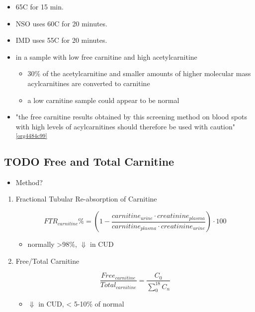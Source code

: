 \documentclass{scrartcl}
\begin{document}
\begin{enumerate}
\begin{itemize}
\item 65\degree{}C for 15 min.
\item NSO uses 60\degree{}C for 20 minutes.
\item IMD uses 55\degree{}C for 20 minutes.

\item in a sample with low free carnitine and high acetylcarnitine
\begin{itemize}
\item 30\% of the acetylcarnitine and smaller amounts of higher
molecular mass acylcarnitines are converted to carnitine
\item a low carnitine sample could appear to be normal
\end{itemize}
\item "the free carnitine results obtained by this screening method on
blood spots with high levels of acylcarnitines should therefore be
used with caution" \textsuperscript{\ref{org4484c99}}
\end{itemize}
\end{enumerate}


\subsection{{\bfseries\sffamily TODO} Free and Total Carnitine}
\label{sec:orgb8ed1d4}
\begin{itemize}
\item Method?
\end{itemize}
\begin{enumerate}
\item Fractional Tubular Re-absorption of Carnitine
\label{sec:org4437812}

\begin{equation*}
FTR_{carnitine}\% = \left( 1 -  \frac{carnitine_{urine} \cdot creatinine_{plasma}}{carnitine_{plasma} \cdot creatinine_{urine}}\right) \cdot 100
\end{equation*}

\begin{itemize}
\item normally >98\%, \(\Downarrow\) in CUD
\end{itemize}

\item Free/Total Carnitine
\label{sec:orgaff6dab}

\[
\frac{Free_{carnitine}}{Total_{carnitine}} = \frac{C_0}{\sum_{0}^{18} C_n}
\]

\begin{itemize}
\item \(\Downarrow\) in CUD, < 5-10\% of normal
\end{itemize}
\end{enumerate}
\end{document}

